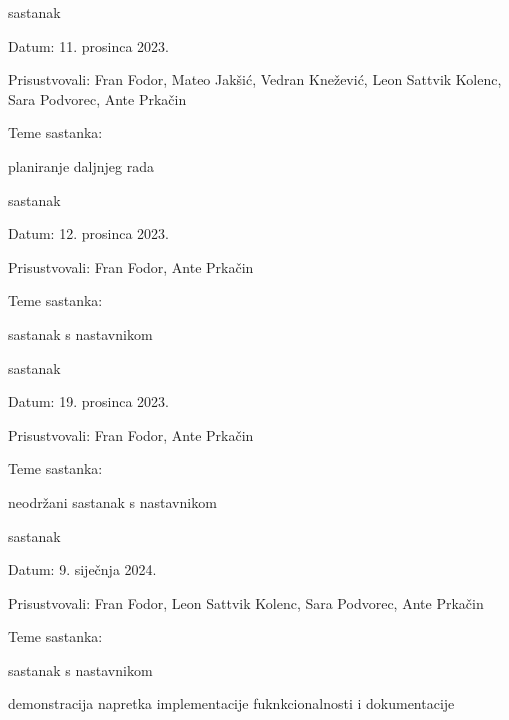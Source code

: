 \begin{packed_enum}
			\item  sastanak
			\item[] \begin{packed_item}
				\item Datum: {11. prosinca 2023.}
				\item Prisustvovali: {Fran Fodor, Mateo Jakšić, Vedran Knežević, Leon Sattvik Kolenc, Sara Podvorec, Ante Prkačin}
				\item Teme sastanka:
				\begin{packed_item}
					\item  planiranje daljnjeg rada
				\end{packed_item}
			\end{packed_item}

			\item  sastanak
			\item[] \begin{packed_item}
				\item Datum: {12. prosinca 2023.}
				\item Prisustvovali: {Fran Fodor, Ante Prkačin}
				\item Teme sastanka:
				\begin{packed_item}
					\item  sastanak s nastavnikom
				\end{packed_item}
			\end{packed_item}

			\item  sastanak
			\item[] \begin{packed_item}
				\item Datum: {19. prosinca 2023.}
				\item Prisustvovali: {Fran Fodor, Ante Prkačin}
				\item Teme sastanka:
				\begin{packed_item}
					\item  neodržani sastanak s nastavnikom
				\end{packed_item}
			\end{packed_item}

			\item  sastanak
			\item[] \begin{packed_item}
				\item Datum: {9. siječnja 2024.}
				\item Prisustvovali: {Fran Fodor, Leon Sattvik Kolenc, Sara Podvorec, Ante Prkačin}
				\item Teme sastanka:
				\begin{packed_item}
					\item  sastanak s nastavnikom
					\item  demonstracija napretka implementacije fuknkcionalnosti i dokumentacije
				\end{packed_item}
			\end{packed_item}


\end{packed_enum}
